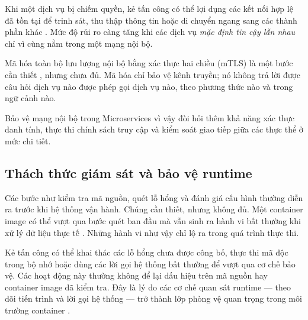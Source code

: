 
Khi một dịch vụ bị chiếm quyền, kẻ tấn công có thể lợi dụng các kết nối hợp lệ đã tồn tại để trinh sát, thu thập thông tin hoặc di chuyển ngang sang các thành phần khác \parencite{mitre_t1046,mitre_t1021}. Mức độ rủi ro càng tăng khi các dịch vụ \textit{mặc định tin cậy lẫn nhau} chỉ vì cùng nằm trong một mạng nội bộ.

Mã hóa toàn bộ lưu lượng nội bộ bằng xác thực hai chiều (mTLS) là một bước cần thiết \parencite{nist800204a_service_mesh,nist800204b_abac_microservices}, nhưng chưa đủ. Mã hóa chỉ bảo vệ kênh truyền; nó không trả lời được câu hỏi dịch vụ nào được phép gọi dịch vụ nào, theo phương thức nào và trong ngữ cảnh nào.

Bảo vệ mạng nội bộ trong Microservices vì vậy đòi hỏi thêm khả năng xác thực danh tính, thực thi chính sách truy cập và kiểm soát giao tiếp giữa các thực thể ở mức chi tiết.

\subsection{Thách thức giám sát và bảo vệ runtime}

Các bước như kiểm tra mã nguồn, quét lỗ hổng và đánh giá cấu hình thường diễn ra trước khi hệ thống vận hành. Chúng cần thiết, nhưng không đủ. Một container image có thể vượt qua bước quét ban đầu mà vẫn sinh ra hành vi bất thường khi xử lý dữ liệu thực tế \parencite{nist800204c_devsecops_microservices,tetragon_docs}. Những hành vi như vậy chỉ lộ ra trong quá trình thực thi.

Kẻ tấn công có thể khai thác các lỗ hổng chưa được công bố, thực thi mã độc trong bộ nhớ hoặc dùng các lời gọi hệ thống bất thường để vượt qua cơ chế bảo vệ. Các hoạt động này thường không để lại dấu hiệu trên mã nguồn hay container image đã kiểm tra. Đây là lý do các cơ chế quan sát runtime --- theo dõi tiến trình và lời gọi hệ thống --- trở thành lớp phòng vệ quan trọng trong môi trường container \parencite{tetragon_docs}.

